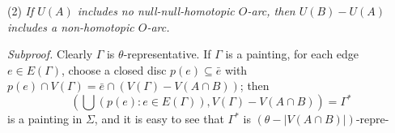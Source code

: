 \hspace*{12pt}(2) \textit{If $U(A)$ includes no null-null-homotopic $O$-arc, then $U(B) - U(A)$ includes a non-homotopic $O$-arc.}

\textit{Subproof.} Clearly $\Gamma$ is $\theta$-representative. If $\Gamma$ is a painting, for each edge $e \in E(\Gamma)$, choose a closed disc $p(e) \subseteq \bar{e}$ with $p(e) \cap V(\Gamma) = \bar{e} \cap (V(\Gamma) - V(A \cap B))$; then
\begin{equation*}
\left(\bigcup (p(e) \colon e \in E(\Gamma)), V(\Gamma) - V(A \cap B)\right) = \Gamma^*
\end{equation*}
is a painting in $\Sigma$, and it is easy to see that $\Gamma^*$ is $(\theta - |V(A \cap B)|)$-repre-

